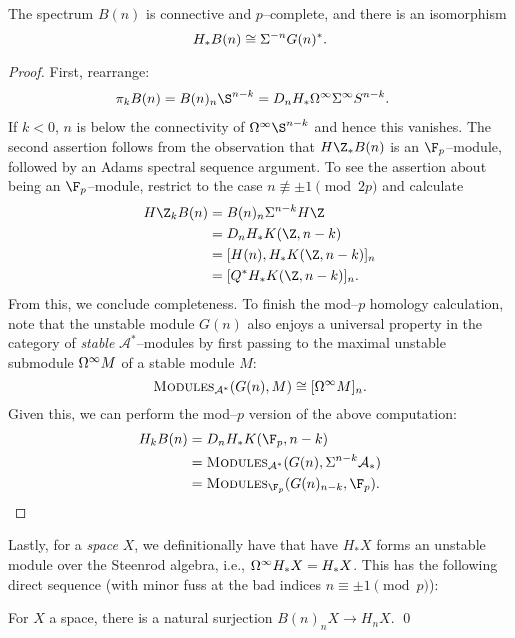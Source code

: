 \begin{lemma}
The spectrum \(B(n)\) is connective and \(p\)--complete, and there is an isomorphism \[H_* B(n) \cong \Sigma^{-n} G(n)^*.\]
\end{lemma}
\begin{proof}
First, rearrange:
\begin{align*}
\pi_k B(n) & = B(n)_n \S^{n-k} = D_n H_* \Loops^\infty \Susp^\infty S^{n-k}.
\end{align*}
If \(k < 0\), \(n\) is below the connectivity of \(\Loops^\infty \S^{n-k}\) and hence this vanishes.  The second assertion follows from the observation that \(H\Z_* B(n)\) is an \(\F_p\)--module, followed by an Adams spectral sequence argument.  To see the assertion about being an \(\F_p\)--module, restrict to the case \(n \not\equiv \pm 1 \pmod{2p}\) and calculate
\begin{align*}
H\Z_k B(n) & = B(n)_n \Susp^{n-k} H\Z \\
& = D_n H_* K(\Z, n-k) \\
& = [H(n), H_* K(\Z, n-k)]_n \\
& = [Q^* H_* K(\Z, n-k)]_n.
\end{align*}
From this, we conclude completeness.  To finish the mod--\(p\) homology calculation, note that the unstable module \(G(n)\) also enjoys a universal property in the category of \emph{stable} \(\mathcal A^*\)--modules by first passing to the maximal unstable submodule \(\Omega^\infty M\) of a stable module \(M\): \[\normalfont\textsc{Modules}_{\mathcal A^*}(G(n), M) \cong [\Omega^\infty M]_n.\]  Given this, we can perform the mod--\(p\) version of the above computation:
\begin{align*}
H_k B(n) & = D_n H_* K(\F_p, n-k) \\
& = \CatOf{Modules}_{\mathcal A^*}(G(n), \Susp^{n-k} \mathcal A_*) \\
& = \CatOf{Modules}_{\F_p}(G(n)_{n-k}, \F_p). \qedhere
\end{align*}
\end{proof}

Lastly, for a \emph{space} \(X\), we definitionally have that have \(H_* X\) forms an unstable module over the Steenrod algebra, i.e., \(\Omega^\infty H_* X = H_* X\).  This has the following direct sequence (with minor fuss at the bad indices \(n \equiv \pm 1 \pmod p\)):

\begin{corollary}
For \(X\) a space, there is a natural surjection \(B(n)_n X \to H_n X\). \qed
\end{corollary}

